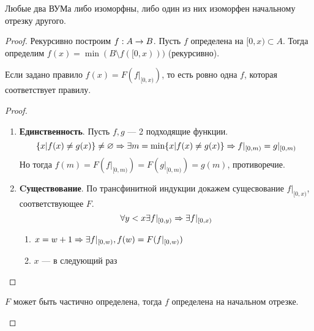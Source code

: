 \begin{theorem}
    Любые два ВУМа либо изоморфны, либо один из них изоморфен начальному отрезку другого.
\end{theorem}
\begin{proof}
    Рекурсивно построим \(f: A \rightarrow B\). Пусть \(f\) определена на \([0, x) \subset A\). Тогда определим \(f(x) = \min(B \setminus f([0, x)))\) (рекурсивно). 
    \begin{theorem}
        Если задано правило \(f(x) = F(f|_{[0, x)})\), то есть ровно одна \(f\), которая соответствует правилу.
    \end{theorem}
    \begin{proof}\indent
        \begin{enumerate}
            \item[] \textbf{Единственность}. Пусть \(f, g\) --- 2 подходящие функции.
            \[\{x | f(x) \ne g(x)\} \ne \varnothing \Rightarrow \exists m = \min\{x| f(x) \ne g(x)\} \Rightarrow f|_{[0, m)} = g|_{[0, m)}\]
            Но тогда \(f(m) = F(f|_{[0, m)}) = F(g|_{[0, m)}) = g(m)\), противоречие.

            \item[] \textbf{Cуществование}. По трансфинитной индукции докажем сущесвование \(f|_{[0, x)}\), соответствующее \(F\).
            \[\forall y < x \exists f|_{[0, y)} \Rightarrow \exists f|_{[0, x)}\]
            \begin{enumerate}
                \item \(x = w + 1 \Rightarrow \exists f|_{[0, w)}, f(w) = F(f|_{[0, w)})\)
                \item \(x\)  --- в следующий раз
            \end{enumerate}
        \end{enumerate}
    \end{proof}
    \begin{theorem}
        \(F\) может быть частично определена, тогда \(f\) определена на начальном отрезке.
    \end{theorem}
\end{proof}